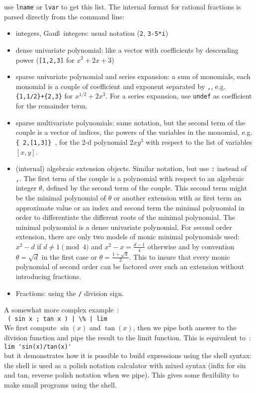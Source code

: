 \documentclass{article}
\begin{document}
\begin{enumerate}
use {\tt lname} or {\tt lvar} to get this list. The internal format
for rational fractions is parsed directly from the command line:
\begin{itemize}
\item integers, Gau\ss\ integers: usual notation ({\tt 2}, {\tt 3-5*i})  
\item dense univariate polynomial: like a vector with coefficients
by descending power ({\tt [1,2,3]} for $x^2+2x+3$) 
\item sparse univariate polynomial and series expansion: a sum of
monomials, each monomial is a couple of coefficient and exponent separated
by {\tt ,}, e.g. {\tt \{1,1/2\}+\{2,3\}} for $x^{1/2}+2x^3$. For
a series expansion, use {\tt undef} as coefficient for the remainder
term.
\item sparse multivariate polynomials: same notation, but the second
term of the couple is a vector of indices, the powers of the variables
in the monomial, e.g. {\tt \{ 2,[1,3]\} }, for the 2-d polynomial
$2xy^3$ with respect to the list of variables $[x,y]$.
\item (internal) algebraic extension objects. Similar notation, but
use {\tt :} instead of {\tt ,}. The first term of the couple is a
polynomial with respect to an algebraic integer $\theta$, defined by the second
term of the couple. This second term might be the minimal polynomial
of $\theta$ or another extension with as first term an approximate
value or an index and second term the minimal polynomial in order to
differentiate the different roots of the minimal polynomial. The
minimal polynomial is a dense univariate polynomial.
For second order extension, there are only two models of monic minimal
polynomials used: $x^2-d$ if $d \neq 1 \pmod 4$ and $x^2-x=\frac{d-1}{4}$
otherwise and by convention $\theta=\sqrt{d}$ in the first case
or $\theta=\frac{1+\sqrt{d}}{2}$. This to insure that every monic polynomial
of second order can be factored over such an extension without introducing
fractions.
\item Fractions: using the {\tt /} division sign.
\end{itemize}
\end{enumerate}

A somewhat more complex example~:\\
\verb? ( sin x ; tan x ) | \% | lim?\\
We first compute $\sin(x)$ and $\tan(x)$, then we pipe both answer to the
division function and pipe the result to the limit function.
This is equivalent to~:\\
\verb|lim 'sin(x)/tan(x)'|\\
but it demonstrates how it is possible to build expressions using the
shell syntax: the shell is used as a polish notation calculator with
mixed syntax (infix for sin and tan, reverse polish notation when we pipe).
This gives some flexibility to make small programs using the shell.
\end{document}
